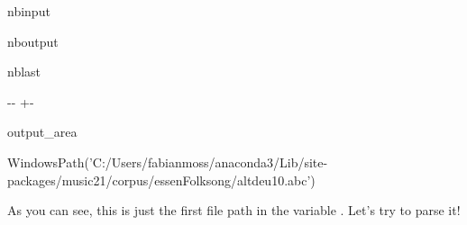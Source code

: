 \documentclass[letterpaper,10pt,english]{sphinxmanual}
\newlength\nbsphinxcodecellspacing
\begin{document}
\begin{sphinxuseclass}{nbinput}
{
\begin{sphinxVerbatim}[commandchars=\\\{\}]
\llap{\color{nbsphinxin}[12]:\,\hspace{\fboxrule}\hspace{\fboxsep}}\PYG{p}{[}\PYG{p}{]}
\end{sphinxVerbatim}
}

\end{sphinxuseclass}
\begin{sphinxuseclass}{nboutput}
\begin{sphinxuseclass}{nblast}
{

\kern-\sphinxverbatimsmallskipamount\kern-\baselineskip
\kern+\FrameHeightAdjust\kern-\fboxrule
\vspace{\nbsphinxcodecellspacing}

\begin{sphinxuseclass}{output_area}
\begin{sphinxuseclass}{}


\begin{sphinxVerbatim}[commandchars=\\\{\}]
\llap{\color{nbsphinxout}[12]:\,\hspace{\fboxrule}\hspace{\fboxsep}}WindowsPath('C:/Users/fabianmoss/anaconda3/Lib/site-packages/music21/corpus/essenFolksong/altdeu10.abc')
\end{sphinxVerbatim}



\end{sphinxuseclass}
\end{sphinxuseclass}
}

\end{sphinxuseclass}
\end{sphinxuseclass}
\sphinxAtStartPar
As you can see, this is just the first file path in the variable . Let’s try to parse it!
\end{document}
